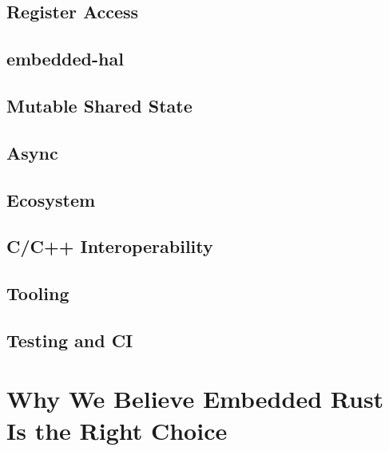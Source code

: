 \subsection{Register Access}
\label{subsec:register_access}
\cite{noauthor_rust-embeddedsvd2rust_2021}
\cite{noauthor_stm32-rsstm32-rs_2021}

\subsection{embedded-hal}
\label{subsec:embedded_hal}

\subsection{Mutable Shared State}
\label{subsec:mut_shared_state}
\cite{rtic}
\cite{egger_look_nodate}

\subsection{Async}
\label{subsec:async}
\cite{aparicio_concurrency_nodate}
\cite{schattinger_asyncawait_2020} %

\subsection{Ecosystem}
\label{subsec:ecosystem}

\subsection{C/C++ Interoperability}
\label{subsec:ccpp_interop}

\subsection{Tooling}
\label{subsec:tooling}

\subsection{Testing and CI}
\label{subsec:testing_ci}

\section{Why We Believe Embedded Rust Is the Right Choice}
\label{sec:embedded_rust_reasoning}